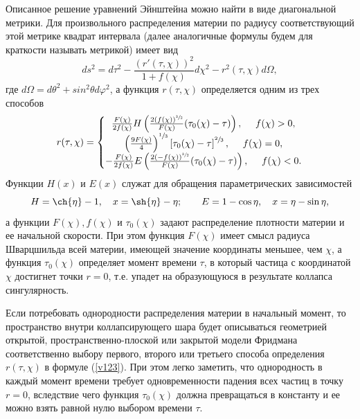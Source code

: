 \documentclass[12pt]{article}
\newcommand{\bq}{\begin{equation}}
\newcommand{\eq}{\end{equation}}
\begin{document}
Описанное решение уравнений Эйнштейна можно найти в виде диагональной метрики. Для произвольного распределения материи по радиусу
соответствующий этой метрике квадрат интервала (далее аналогичные формулы будем для краткости называть метрикой) имеет вид \cite{landavshic2}
\bq
\label{metric}
	d s^2 = d \tau^2 - \frac{(r'(\tau, \chi))^2}{1+f(\chi)} d\chi^2 - r^2(\tau, \chi) d \Omega,
\eq
где $d\Omega=d\theta^2+sin^2\theta d\varphi^2$, а
функция $r(\tau, \chi)$ определяется одним из трех способов
\bq
\label{v123}
	r(\tau, \chi) = \left\{
	\begin{matrix}
	\frac{F(\chi)}{2 f(\chi)} H \left( \frac{2(f(\chi))^{\sfrac{3}{2}} }{F(\chi)}(\tau_0(\chi)-\tau)  \right) , \ \ \ \ f(\chi) > 0,\\
	\left( \frac{9F(\chi)}{4} \right)^{\sfrac{1}{3}} \left[ \tau_0(\chi)- \tau \right]^{\sfrac{2}{3}}, \ \ \ \ f(\chi) = 0, \\
	- \frac{F(\chi)}{2 f(\chi)} E \left( \frac{2(-f(\chi))^{\sfrac{3}{2}} }{F(\chi)}(\tau_0(\chi)-\tau) \right), \ \ \ \ f(\chi) < 0.
	\end{matrix} \right.
\eq
Функции $H(x)$ и $E(x)$ служат для обращения параметрических зависимостей
\bq\label{sp4}
H = \ch{\eta}-1,\quad x = \sh{\eta} - \eta;\qquad
E = 1 - \cos{\eta},\quad x = \eta - \sin{\eta},
\eq
а функции $F(\chi), f(\chi)$ и $\tau_0(\chi)$ задают распределение плотности материи и ее начальной скорости.
При этом функция $F(\chi)$ имеет смысл радиуса Шварцшильда всей материи, имеющей значение координаты меньшее, чем $\chi$,
а функция $\tau_0(\chi)$ определяет момент времени $\tau$, в который частица с координатой $\chi$
достигнет точки $r=0$, т.е. упадет на образующуюся в результате коллапса сингулярность.

Если потребовать однородности распределения материи в начальный момент, то пространство внутри коллапсирующего шара будет описываться геометрией открытой, пространственно-плоской или закрытой модели Фридмана соответственно выбору первого, второго или третьего способа определения $r(\tau, \chi)$ в формуле (\ref{v123}).
При этом легко заметить, что однородность в каждый момент времени требует одновременности падения всех частиц
в точку $r=0$, вследствие чего функция $\tau_0(\chi)$ должна превращаться в константу и ее можно взять равной нулю выбором времени $\tau$.
\end{document}
